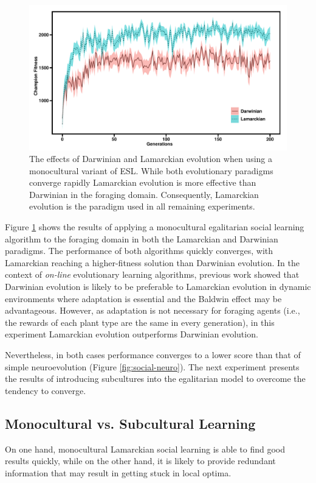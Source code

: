 \documentclass{sig-alternate}
\begin{document}
\begin{figure}
  \centering
    \includegraphics[scale=.42]{darwinian_vs_lamarckian_evolution.pdf}
  \caption{The effects of Darwinian and Lamarckian evolution when using a monocultural variant of ESL.  While both evolutionary paradigms converge rapidly Lamarckian evolution is more effective than Darwinian in the foraging domain.  Consequently, Lamarckian evolution is the paradigm used in all remaining experiments.}
  \label{fig:darwin-lamarck}
\end{figure}


Figure \ref{fig:darwin-lamarck} shows the results of applying a monocultural egalitarian social learning algorithm to the foraging domain in both the Lamarckian and Darwinian paradigms. The performance of both algorithms quickly converges, with Lamarckian reaching a higher-fitness solution than Darwinian evolution. In the context of \textit{on-line} evolutionary learning algorithms, previous work \cite{whiteson2006evolutionary} showed that Darwinian evolution is likely to be preferable to Lamarckian evolution in dynamic environments where adaptation is essential and the Baldwin effect \cite{simpson1953baldwin} may be advantageous. However, as adaptation is not necessary for foraging agents (i.e., the rewards of each plant type are the same in every generation), in this experiment Lamarckian evolution outperforms Darwinian evolution.

Nevertheless, in both cases performance converges to a lower score than that of simple neuroevolution (Figure \ref{fig:social-neuro}). The next experiment presents the results of introducing subcultures into the egalitarian model to overcome the tendency to converge.

\subsection{Monocultural vs. Subcultural Learning}
On one hand, monocultural Lamarckian social learning is able to find good results quickly, while on the other hand, it is likely to provide redundant information that may result in getting stuck in local optima.  
\end{document}
